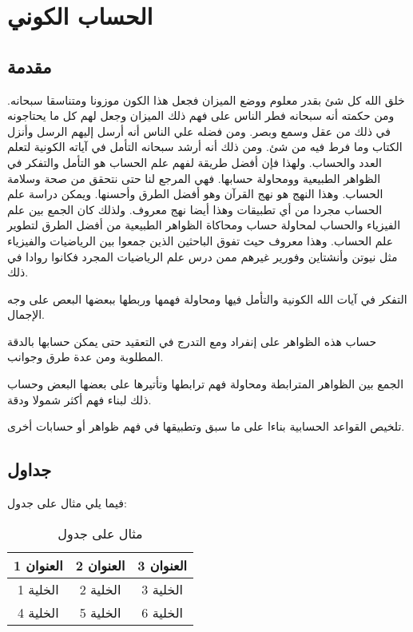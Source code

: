 \chapter{الحساب الكوني}


\section{مقدمة}
خلق الله كل شئ بقدر معلوم ووضع الميزان فجعل هذا الكون موزونا ومتناسقا سبحانه. ومن حكمته أنه سبحانه فطر الناس على فهم ذلك الميزان وجعل لهم كل ما يحتاجونه في ذلك من عقل وسمع وبصر. ومن فضله علي الناس أنه أرسل إليهم الرسل وأنزل الكتاب وما فرط فيه من شئ. ومن ذلك أنه أرشد سبحانه التأمل في آياته الكونية لتعلم العدد والحساب. ولهذا فإن أفضل طريقة لفهم علم الحساب هو التأمل والتفكر في الظواهر الطبيعية وومحاولة حسابها. فهي المرجع لنا حتى نتحقق من صحة وسلامة الحساب. وهذا النهج هو نهج القرآن وهو أفضل الطرق وأحسنها. ويمكن دراسة علم الحساب مجردا من أي تطبيقات وهذا أيضا نهج معروف. ولذلك كان الجمع بين علم الفيزياء والحساب لمحاولة حساب ومحاكاة الظواهر الطبيعية من أفضل الطرق لتطوير علم الحساب. وهذا معروف حيث تفوق الباحثين الذين جمعوا بين الرياضيات والفيزياء مثل نيوتن وأنشتاين وفورير غيرهم ممن درس علم الرياضيات المجرد فكانوا روادا في ذلك.

\begin{compactitem}
  \item التفكر في آيات الله الكونية والتأمل فيها ومحاولة فهمها وربطها ببعضها البعص على وجه الإجمال.
  \item حساب هذه الظواهر على إنفراد ومع التدرج في التعقيد حتى يمكن حسابها بالدقة المطلوبة ومن عدة طرق وجوانب.
  \item الجمع بين الظواهر المترابطة ومحاولة فهم ترابطها وتأتيرها على بعضها البعض وحساب ذلك لبناء فهم أكثر شمولا ودقة.
  \item تلخيص القواعد الحسابية بناءا على ما سبق وتطبيقها في فهم ظواهر أو حسابات أخرى.
\end{compactitem}

\section{جداول}
فيما يلي مثال على جدول:

\begin{table}[h]
  \centering
  \begin{tabular}{|c|c|c|}
    \hline
    العنوان 1 & العنوان 2 & العنوان 3 \\
    \hline
    الخلية 1  & الخلية 2  & الخلية 3  \\
    \hline
    الخلية 4  & الخلية 5  & الخلية 6  \\
    \hline
  \end{tabular}
  \caption{مثال على جدول}
\end{table}

